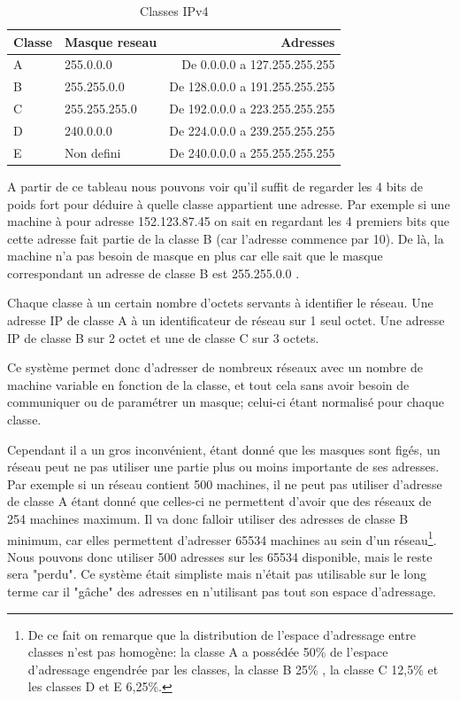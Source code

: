 \begin{table}[h]
  \centering
  \begin{tabular}{| p{5cm} | p{5cm} | r |}
    \hline
    \textbf{Classe} & \textbf{Masque reseau} & \textbf{Adresses}\\
    \hline
    A & 255.0.0.0 & De 0.0.0.0 a 127.255.255.255\\
    \hline
    B & 255.255.0.0 & De 128.0.0.0 a 191.255.255.255\\
    \hline
    C & 255.255.255.0 & De 192.0.0.0 a 223.255.255.255\\
    \hline
    D & 240.0.0.0 & De 224.0.0.0 a 239.255.255.255\\
    \hline
    E & Non defini & De 240.0.0.0 a 255.255.255.255\\
    \hline
  \end{tabular}
  \caption{Classes IPv4}
  \label{tab:classes}
\end{table}

A partir de ce tableau nous pouvons voir qu'il suffit de regarder les 4 bits de
poids fort pour déduire à quelle classe appartient une adresse.  Par exemple si
une machine à pour adresse 152.123.87.45 on sait en regardant les 4 premiers
bits que cette adresse fait partie de la classe B (car l'adresse commence par
10). De là, la machine n'a pas besoin de masque en plus car elle sait que le
masque correspondant un adresse de classe B est 255.255.0.0 .

Chaque classe à un certain nombre d'octets servants à identifier le réseau. Une
adresse IP de classe A à un identificateur de réseau sur 1 seul octet. Une
adresse IP de classe B sur 2 octet et une de classe C sur 3 octets.

Ce système permet donc d'adresser de nombreux réseaux avec un nombre de machine
variable en fonction de la classe, et tout cela sans avoir besoin de
communiquer ou de paramétrer un masque; celui-ci étant normalisé pour chaque
classe.  

Cependant il a un gros inconvénient, étant donné que les masques sont
figés, un réseau peut ne pas utiliser une partie plus ou moins importante
de ses adresses. Par exemple si un réseau contient 500 machines, il ne peut pas
utiliser d'adresse de classe A étant donné que celles-ci ne permettent d'avoir
que des réseaux de 254 machines maximum. Il va donc falloir utiliser des
adresses de classe B minimum, car elles permettent d'adresser 65534 machines au
sein d'un réseau\footnote{
De ce fait on remarque que la distribution de l’espace d’adressage entre
classes n'est pas homogène: la classe A a possédée 50\% de l’espace
d'adressage engendrée par les classes, la classe B 25\% , la classe C 12,5\%  et
les classes D et E 6,25\%.}. Nous pouvons donc utiliser 500 adresses sur les 65534
disponible, mais le reste sera "perdu".  Ce système était simpliste mais
n'était pas utilisable sur le long terme car il "gâche" des adresses en
n'utilisant pas tout son espace d'adressage.

